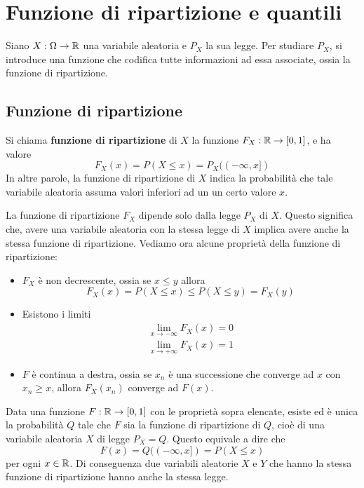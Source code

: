 \section{Funzione di ripartizione e quantili}
Siano $X : \Omega \to \mathbb{R}$ una variabile aleatoria e $P_X$ la sua legge. Per studiare $P_X$, si
introduce una funzione che codifica tutte informazioni ad essa associate, ossia la funzione di
ripartizione.

\subsection{Funzione di ripartizione}
\begin{definition}
	Si chiama \textbf{funzione di ripartizione} di $X$ la funzione $F_X : \mathbb{R} \to [0,1]$, e ha
	valore
	\[ F_X(x) = P (X \leq x) = P_X ((-\infty, x]) \]
	In altre parole, la funzione di ripartizione di $X$ indica la probabilità che tale variabile
	aleatoria assuma valori inferiori ad un un certo valore $x$.
\end{definition}

La funzione di ripartizione $F_X$ dipende solo dalla legge $P_X$ di $X$. Questo significa che,
avere una variabile aleatoria con la stessa legge di $X$ implica avere anche la stessa funzione
di ripartizione. Vediamo ora alcune proprietà della funzione di ripartizione:
\begin{itemize}
	\item $F_X$ è non decrescente, ossia se $x \leq y$ allora
	      \[ F_X(x) = P(X \leq x) \leq P(X \leq y) = F_X(y) \]
	\item Esistono i limiti
	      \begin{gather*}
		      \lim_{x \to -\infty} F_X(x) = 0 \\
		      \lim_{x \to +\infty} F_X(x) = 1
	      \end{gather*}
	\item $F$ è continua a destra, ossia se $x_n$ è una successione che converge ad $x$ con
	      $x_n \geq x$, allora $F_X(x_n)$ converge ad $F(x)$.
\end{itemize}

\begin{proposition}
	Data una funzione $F : \mathbb{R} \to [0,1]$ con le proprietà sopra elencate, esiste ed è unica la
	probabilità $Q$ tale che $F$ sia la funzione di ripartizione di $Q$, cioè di una variabile
	aleatoria $X$ di legge $P_X = Q$. Questo equivale a dire che
	\[ F(x) = Q((-\infty, x]) = P(X \leq x) \]
	per ogni $x \in \mathbb{R}$. Di conseguenza due variabili aleatorie $X$ e $Y$ che hanno la stessa
	funzione di ripartizione hanno anche la stessa legge.
\end{proposition}

